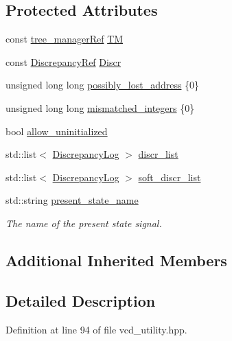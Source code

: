\subsection*{Protected Attributes}
\begin{DoxyCompactItemize}
\item 
const \hyperlink{tree__manager_8hpp_a96ff150c071ce11a9a7a1e40590f205e}{tree\+\_\+manager\+Ref} \hyperlink{classvcd__utility_ada6cdc0efd5c0b4848cdf922330387a5}{TM}
\item 
const \hyperlink{Discrepancy_8hpp_a9fb5a8938b4eeaafdaf7707f583f0193}{Discrepancy\+Ref} \hyperlink{classvcd__utility_a1fba2ae138894471f8fe8ea0efe604fe}{Discr}
\item 
unsigned long long \hyperlink{classvcd__utility_abda11f233eaef57efb5530f3a4d2e96c}{possibly\+\_\+lost\+\_\+address} \{0\}
\item 
unsigned long long \hyperlink{classvcd__utility_a5f365402f79dfa5cf2fe7f91745f8d8b}{mismatched\+\_\+integers} \{0\}
\item 
bool \hyperlink{classvcd__utility_a734d54c2216274c77124a96daad230ba}{allow\+\_\+uninitialized}
\item 
std\+::list$<$ \hyperlink{structDiscrepancyLog}{Discrepancy\+Log} $>$ \hyperlink{classvcd__utility_aba0984fc0ce2857599e312b5f273ad17}{discr\+\_\+list}
\item 
std\+::list$<$ \hyperlink{structDiscrepancyLog}{Discrepancy\+Log} $>$ \hyperlink{classvcd__utility_a524a718fb71b858a973a4c12527d09ae}{soft\+\_\+discr\+\_\+list}
\item 
std\+::string \hyperlink{classvcd__utility_a40821ad341c215284ec3e7cdbeff0961}{present\+\_\+state\+\_\+name}
\begin{DoxyCompactList}\small\item\em The name of the present state signal. \end{DoxyCompactList}\end{DoxyCompactItemize}
\subsection*{Additional Inherited Members}


\subsection{Detailed Description}


Definition at line 94 of file vcd\+\_\+utility.\+hpp.



